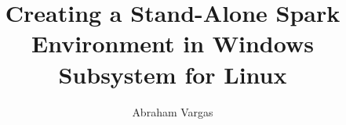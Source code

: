 \documentclass{article}
\begin{document}
    \title{Creating a Stand-Alone Spark Environment in Windows Subsystem for Linux}
    \author{Abraham Vargas}
    \maketitle
\end{document}
